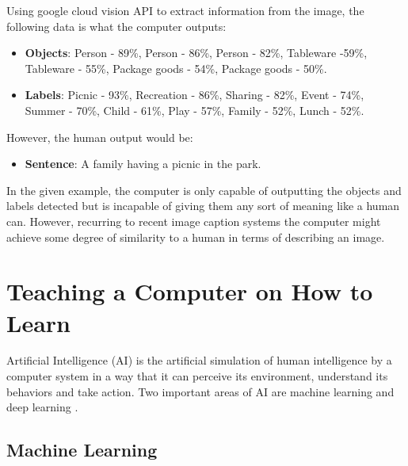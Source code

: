     Using google cloud vision API \cite{google} to extract information from the image, the following data is what the computer outputs:

    \begin{itemize}
        \item \textbf{Objects}: Person - 89\%, Person - 86\%, Person - 82\%, Tableware -59\%, Tableware - 55\%, Package goods - 54\%, Package goods - 50\%. 
        \item \textbf{Labels}: Picnic - 93\%, Recreation - 86\%, Sharing - 82\%, Event - 74\%, Summer - 70\%, Child - 61\%, Play - 57\%, Family - 52\%, Lunch - 52\%.
    \end{itemize}
   
   However, the human output would be: 
   
   \begin{itemize}
       \item \textbf{Sentence}: A family having a picnic in the park.
   \end{itemize}

    
   
    In the given example, the computer is only capable of outputting the objects and labels detected but is incapable of giving them any sort of meaning like a human can. However, recurring to recent image caption systems the computer might achieve some degree of similarity to a human in terms of describing an image.





    \section{Teaching a Computer on How to Learn}
    \label{sec:teach}

    Artificial Intelligence (AI) is the artificial simulation of human intelligence by a computer system in a way that it can perceive its environment, understand its behaviors and take action. Two important areas of AI are machine learning and deep learning \cite{mathworks_AI}.

    

   \subsection{Machine Learning}

